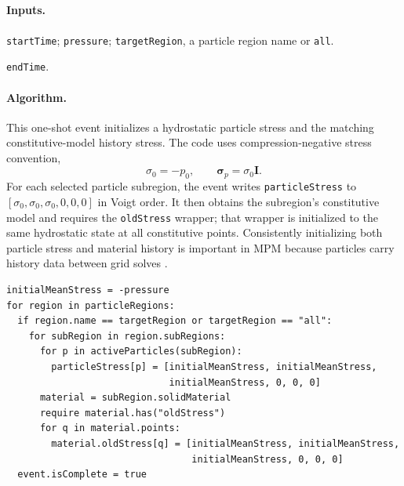 \subsection{}
\label{subsec:event-initialize-stress}

\paragraph{Inputs.}
\begin{description}[leftmargin=*,style=nextline]
\item[\textbf{Required.}] \texttt{startTime}; \texttt{pressure}; \texttt{targetRegion}, a particle region name or \texttt{all}.
\item[\textbf{Optional.}] \texttt{endTime}.
\end{description}

\paragraph{Algorithm.}
This one-shot event initializes a hydrostatic particle stress and the matching constitutive-model history stress.  The code uses compression-negative stress convention,
\begin{equation}
  \sigma_0=-p_0,
  \qquad
  \boldsymbol{\sigma}_p=\sigma_0\mathbf{I}.
  \label{eq:initialize-stress}
\end{equation}
For each selected particle subregion, the event writes \texttt{particleStress} to $[\sigma_0,\sigma_0,\sigma_0,0,0,0]$ in Voigt order.  It then obtains the subregion's constitutive model and requires the \texttt{oldStress} wrapper; that wrapper is initialized to the same hydrostatic state at all constitutive points.  Consistently initializing both particle stress and material history is important in MPM because particles carry history data between grid solves \cite{sulsky1994history,sulsky1995solid}.

\begin{lstlisting}[caption={InitializeStress event pseudocode.}]
initialMeanStress = -pressure
for region in particleRegions:
  if region.name == targetRegion or targetRegion == "all":
    for subRegion in region.subRegions:
      for p in activeParticles(subRegion):
        particleStress[p] = [initialMeanStress, initialMeanStress,
                             initialMeanStress, 0, 0, 0]
      material = subRegion.solidMaterial
      require material.has("oldStress")
      for q in material.points:
        material.oldStress[q] = [initialMeanStress, initialMeanStress,
                                 initialMeanStress, 0, 0, 0]
  event.isComplete = true
\end{lstlisting}

